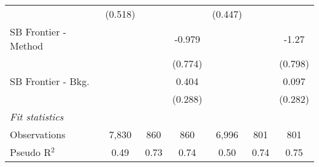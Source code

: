 \begin{tabular}{lcccccc}
                                & (0.518)        &               &               & (0.447)        &               &   \\   
   SB Frontier - Method         &                &               & -0.979        &                &               & -1.27\\   
                                &                &               & (0.774)       &                &               & (0.798)\\   
   SB Frontier - Bkg.           &                &               & 0.404         &                &               & 0.097\\   
                                &                &               & (0.288)       &                &               & (0.282)\\   
   \midrule
   \emph{Fit statistics}\\
   Observations                 & 7,830          & 860           & 860           & 6,996          & 801           & 801\\  
   Pseudo R$^2$                 & 0.49           & 0.73          & 0.74          & 0.50           & 0.74          & 0.75\\  
   

\end{tabular}
